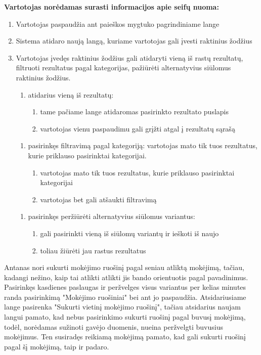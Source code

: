 \documentclass{VUMIFPSkursinis}
\begin{document}
\begin{center}
	\textbf{Vartotojas norėdamas surasti informacijos apie seifų nuoma:}
\end{center}
\begin{enumerate}
	\item Vartotojas paspaudžia ant paieškos mygtuko pagrindiniame lange
	\item Sistema atidaro naują langą, kuriame vartotojas gali įvesti raktinius žodžius
	\item Vartotojas įvedęs raktinius žodžius gali atidaryti vieną iš rastų rezultatų, filtruoti rezultatus pagal kategorijas, pažiūrėti alternatyvius siūlomus raktinius žodžius.
	\begin{enumerate}
		\item atidarius vieną iš rezultatų:
		\begin{enumerate}
			\item tame pačiame lange atidaromas pasirinkto rezultato puslapis
			\item vartotojas vienu paspaudimu gali grįžti atgal į rezultatų sąrašą
		\end{enumerate}
	\end{enumerate}
	\begin{enumerate}
		\item pasirinkęs filtravimą pagal kategoriją: vartotojas mato tik tuos rezultatus, kurie priklauso pasirinktai kategorijai.
		\begin{enumerate}
			\item vartotojas mato tik tuos rezultatus, kurie priklauso pasirinktai kategorijai
			\item vartotojas bet gali atšaukti filtravimą
		\end{enumerate}
	\end{enumerate}
	\begin{enumerate}
		\item pasirinkęs peržiūrėti alternatyvius siūlomus variantus:
		\begin{enumerate}
			\item gali pasirinkti vieną iš siūlomų variantų ir ieškoti iš naujo
			\item toliau žiūrėti jau rastus rezultatus
		\end{enumerate}
	\end{enumerate}
\end{enumerate}
Antanas nori sukurti mokėjimo ruošinį pagal seniau atliktą mokėjimą, tačiau, kadangi nežino, kaip tai atlikti atlikti jis bando orientuotis pagal pavadinimus. Pasirinkęs kasdienes paslaugas ir peržvelges visus variantus per kelias minutes randa pasirinkimą "Mokėjimo ruošiniai" bei ant jo paspaudžia. Atsidariusiame lange pasirenka "Sukurti vietinį mokėjimo ruošinį", tačiau atsidarius naujam langui pamato, kad nebus pasirinkimo sukurti ruošinį pagal buvusį mokėjimą, todėl, norėdamas sužinoti gavėjo duomenis, nueina peržvelgti buvusius mokėjimus. Ten susiradęs reikiamą mokėjimą pamato, kad gali sukurti ruošinį pagal šį mokėjimą, taip ir padaro.
\end{document}
